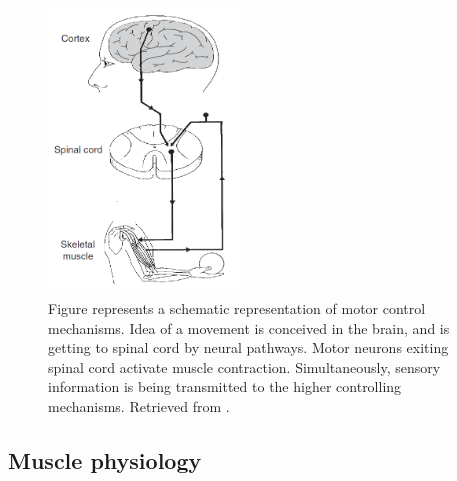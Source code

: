 \begin{figure}[ht]
\centering
\includegraphics[width=0.45\textwidth]{Images/introduction/control-merletti2.png}
\caption{Figure represents a schematic representation of motor control mechanisms. Idea of a movement is conceived in the brain, and is getting to spinal cord by neural pathways. Motor neurons exiting spinal cord activate muscle contraction. Simultaneously, sensory information is being transmitted to the higher controlling mechanisms. Retrieved from \citet{Merletti-book}.}
\label{fig:control-merletti}
\end{figure}


\subsection{Muscle physiology}

